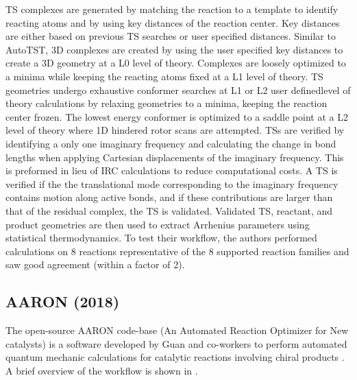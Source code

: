 \documentclass[preprint, 11pt]{elsarticle} %
\begin{document}
TS complexes are generated by matching the reaction to a template to identify reacting atoms and by using key distances of the reaction center. 
Key distances are either based on previous TS searches or user specified distances.
Similar to AutoTST, 3D complexes are created by using the user specified key distances to create a 3D geometry at a L0 level of theory.
Complexes are loosely optimized to a minima while keeping the reacting atoms fixed at a L1 level of theory.
TS geometries undergo exhaustive conformer searches at L1 or L2 user definedlevel of theory calculations by relaxing geometries to a minima, keeping the reaction center frozen.
The lowest energy conformer is optimized to a saddle point at a L2 level of theory where 1D hindered rotor scans are attempted. 
TSs are verified by identifying a only one imaginary frequency and calculating the change in bond lengths when applying Cartesian displacements of the imaginary frequency.
This is preformed in lieu of IRC calculations to reduce computational costs.
A TS is verified if the the translational mode corresponding to the imaginary frequency contains motion along active bonds, and if these contributions are larger than that of the residual complex, the TS is validated. 
Validated TS, reactant, and product geometries are then used to extract Arrhenius parameters using statistical thermodynamics.
To test their workflow, the authors performed calculations on 8 reactions representative of the 8 supported reaction families and saw good agreement (within a factor of 2).


\subsection{AARON (2018)}

The open-source AARON code-base (An Automated Reaction Optimizer for New catalysts) is a software developed by Guan and co-workers to perform automated quantum mechanic calculations for catalytic reactions involving chiral products \cite{Guan:2018}. 
A brief overview of the workflow is shown in .
\end{document}
